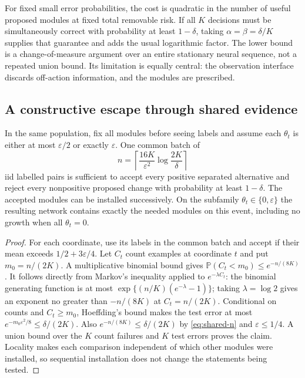For fixed small error probabilities, the cost is quadratic in the number
of useful proposed modules at fixed total removable risk. If all $K$
decisions must be simultaneously correct with probability at least
$1-\delta$, taking $\alpha=\beta=\delta/K$ supplies that guarantee and
adds the usual logarithmic factor. The lower bound is a change-of-measure
argument over an entire stationary neural sequence, not a repeated union
bound. Its limitation is equally central: the observation interface
discards off-action information, and the modules are prescribed.

\subsection{A constructive escape through shared evidence}

\begin{theorem}
\label{thm:shared-evidence}
In the same population, fix all modules before seeing labels and assume
each $\theta_t$ is either at most $\varepsilon/2$ or exactly $\varepsilon$.
One common batch of
\begin{equation}
 n=\left\lceil\frac{16K}{\varepsilon^2}\log\frac{2K}{\delta}\right\rceil
 \label{eq:shared-n}
\end{equation}
iid labelled pairs is sufficient to accept every positive separated
alternative and reject every nonpositive proposed change with probability
at least $1-\delta$. The accepted modules can be installed successively.
On the subfamily $\theta_t\in\{0,\varepsilon\}$ the resulting network
contains exactly the needed modules on this event, including no growth
when all $\theta_t=0$.
\end{theorem}
\begin{proof}
For each coordinate, use its labels in the common batch and accept if their
mean exceeds $1/2+3\varepsilon/4$. Let $C_t$ count examples at coordinate
$t$ and put $m_0=n/(2K)$. A multiplicative binomial bound gives
$\mathbb P(C_t<m_0)\le e^{-n/(8K)}$.
It follows directly from Markov's inequality applied to
$e^{-\lambda C_t}$: the binomial generating function is at most
$\exp\{(n/K)(e^{-\lambda}-1)\}$; taking $\lambda=\log2$ gives
an exponent no greater than $-n/(8K)$ at $C_t=n/(2K)$.
Conditional on counts and $C_t\ge m_0$, Hoeffding's bound makes the
test error at most
$e^{-m_0\varepsilon^2/8}\le\delta/(2K)$.
Also $e^{-n/(8K)}\le\delta/(2K)$ by \eqref{eq:shared-n} and
$\varepsilon\le1/4$. A union bound over the $K$ count failures and $K$
test errors proves the claim. Locality makes each comparison independent
of which other modules were installed, so sequential installation does
not change the statements being tested.
\end{proof}

